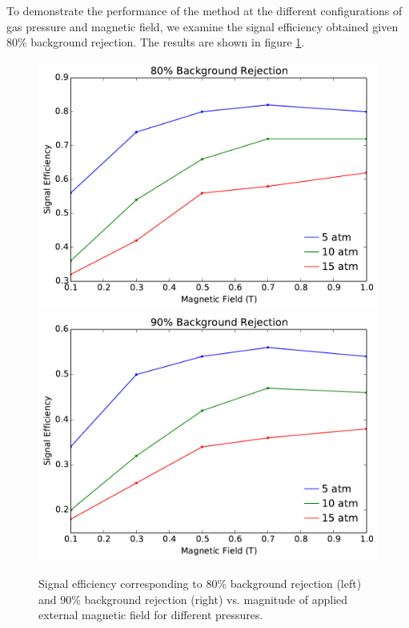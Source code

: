 \documentclass{JINST}
\begin{document}
To demonstrate the performance of the method at the different configurations of gas pressure and magnetic field, we examine the signal efficiency obtained given 80\% background rejection.  The results are shown in figure \ref{fig_config}.

\begin{figure}[!htb]
	\centering
	\includegraphics[scale=0.43]{fig/eff_vs_b_80.pdf}
	\includegraphics[scale=0.43]{fig/eff_vs_b_90.pdf}
	\caption{\label{fig_config}Signal efficiency corresponding to 80\% background rejection (left) and 90\% background rejection (right) vs. magnitude of applied external magnetic field for different pressures.}
\end{figure}

\end{document}

